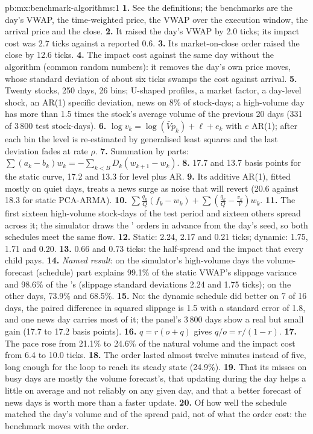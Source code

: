 \begin{solution}{pb:mx:benchmark-algorithms:1}
\textbf{1.} See the definitions; the benchmarks are the day's VWAP, the time-weighted price, the VWAP over the execution window, the arrival price
and the close.
\textbf{2.} It raised the day's VWAP by 2.0 ticks; its impact cost was 2.7 ticks against a reported 0.6.
\textbf{3.} Its market-on-close order raised the close by 12.6 ticks.
\textbf{4.} The impact cost against the same day without the algorithm (common random numbers): it removes the day's own price moves, whose standard
deviation of about six ticks swamps the cost against arrival.
\textbf{5.} Twenty stocks, 250 days, 26 bins; U-shaped profiles, a market factor, a day-level shock, an AR(1) specific deviation, news on 8\% of
stock-days; a high-volume day has more than 1.5 times the stock's average volume of the previous 20 days (331 of 3\,800 test stock-days).
\textbf{6.} $\log v_k=\log(\bar Vp_k)+\ell+e_k$ with $e$ AR(1); after each bin the level is re-estimated by generalised least squares and the last
deviation fades at rate $\rho$.
\textbf{7.} Summation by parts: $\sum(a_k-b_k)w_k=-\sum_{k<B}D_k(w_{k+1}-w_k)$.
\textbf{8.} 17.7 and 13.7 basis points for the static curve, 17.2 and 13.3 for level plus AR.
\textbf{9.} Its additive AR(1), fitted mostly on quiet days, treats a news surge as noise that will revert (20.6 against 18.3 for static PCA-ARMA).
\textbf{10.} $\sum\frac{q_k}{Q}(f_k-w_k)+\sum(\frac{q_k}{Q}-\frac{v_k}{V})w_k$.
\textbf{11.} The first sixteen high-volume stock-days of the test period and sixteen others spread across it; the simulator draws the '
orders in advance from the day's seed, so both schedules meet the same flow.
\textbf{12.} Static: 2.24, 2.17 and 0.21 ticks; dynamic: 1.75, 1.71 and 0.20.
\textbf{13.} 0.66 and 0.73 ticks: the half-spread and the impact that every child  pays.
\textbf{14.} \emph{Named result}: on the simulator's high-volume days the volume-forecast (schedule) part explains 99.1\% of the static VWAP's
slippage variance and 98.6\% of the 's (slippage standard deviations 2.24 and 1.75 ticks); on the other days, 73.9\% and 68.5\%.
\textbf{15.} No: the dynamic schedule did better on 7 of 16 days, the paired difference in squared slippage is 1.5 with a standard error of 1.8, and
one news day carries most of it; the panel's 3\,800 days show a real but small gain (17.7 to 17.2 basis points).
\textbf{16.} $q=r(o+q)$ gives $q/o=r/(1-r)$.
\textbf{17.} The pace rose from 21.1\% to 24.6\% of the natural volume and the impact cost from 6.4 to 10.0 ticks.
\textbf{18.} The order lasted almost twelve minutes instead of five, long enough for the loop to reach its steady state (24.9\%).
\textbf{19.} That its misses on busy days are mostly the volume forecast's, that updating during the day helps a little on average and not reliably
on any given day, and that a better forecast of news days is worth more than a faster update.
\textbf{20.} Of how well the schedule matched the day's volume and of the spread paid, not of what the order cost: the benchmark moves with the
order.
\end{solution}

